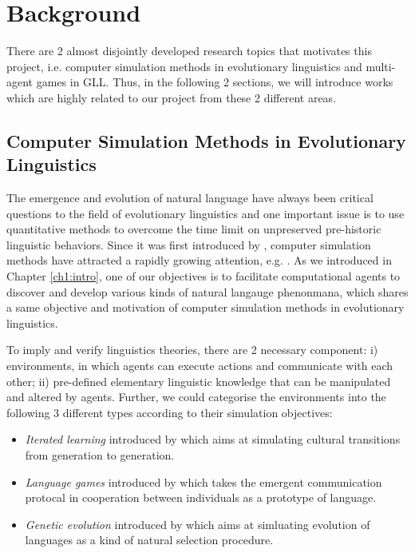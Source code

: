 \chapter{Background}
\label{ch2:background}

There are 2 almost disjointly developed research topics that motivates this project, i.e. computer simulation methods in evolutionary linguistics and multi-agent games in GLL. Thus, in the following 2 sections, we will introduce works which are highly related to our project from these 2 different areas.

\section{Computer Simulation Methods in Evolutionary Linguistics}
\label{sec2.1:evolang}

The emergence and evolution of natural language have always been critical questions to the field of evolutionary linguistics \cite{macwhinney2013emergence} and one important issue is to use quantitative methods to overcome the time limit on unpreserved pre-historic linguistic behaviors\cite{lieberman2006toward, evans2009myth}. Since it was first introduced by \cite{hurford1989biological}, computer simulation methods have attracted a rapidly growing attention, e.g. \cite{hurford1998approaches, knight2000evolutionary, briscoe2002book, christiansen2003language, bickerton2009biological, cangelosi2012simulating}. As we introduced in Chapter \ref{ch1:intro}, one of our objectives is to facilitate computational agents to discover and develop various kinds of natural langauge phenonmana, which shares a same objective and motivation of computer simulation methods in evolutionary linguistics.

To imply and verify linguistics theories, there are 2 necessary component: i) environments, in which agents can execute actions and communicate with each other; ii) pre-defined elementary linguistic knowledge that can be manipulated and altered by agents. Further, we could categorise the environments into the following 3 different types according to their simulation objectives:
\begin{itemize}
  \item \textit{Iterated learning} introduced by \cite{kirby1999function} which aims at simulating cultural transitions from generation to generation.
  \item \textit{Language games} introduced by \cite{wittgenstein2009philosophical} which takes the emergent communication protocal in cooperation between individuals as a prototype of language.
  \item \textit{Genetic evolution} introduced by \cite{briscoe1998language} which aims at simluating evolution of languages as a kind of natural selection procedure\cite{darwin1859origin}.
\end{itemize}

